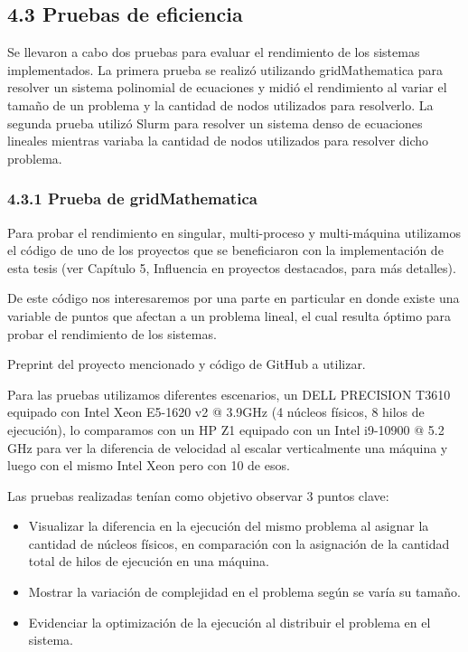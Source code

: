 \begin{spacing}{1.5}
  \subsection{4.3 Pruebas de eficiencia}  \label{chap:4.3}

  Se llevaron a cabo dos pruebas para evaluar el rendimiento de los sistemas implementados. La primera prueba se realizó utilizando gridMathematica para resolver un sistema polinomial de ecuaciones y midió el rendimiento al variar el tamaño de un problema y la cantidad de nodos utilizados para resolverlo. La segunda prueba utilizó Slurm para resolver un sistema denso de ecuaciones lineales mientras variaba la cantidad de nodos utilizados para resolver dicho problema.

  \subsubsection{4.3.1 Prueba de gridMathematica}

  Para probar el rendimiento en singular, multi-proceso y multi-máquina utilizamos el código de uno de los proyectos que se beneficiaron con la implementación de esta tesis (ver Capítulo 5, Influencia en proyectos destacados, para más detalles).

  De este código nos interesaremos por una parte en particular en donde existe una variable de puntos que afectan a un problema lineal, el cual resulta óptimo para probar el rendimiento de los sistemas.

  Preprint del proyecto mencionado y código de GitHub a utilizar. \cite{preprint} \cite{git}

  Para las pruebas utilizamos diferentes escenarios, un DELL PRECISION T3610 equipado con Intel Xeon E5-1620 v2 @ 3.9GHz (4 núcleos físicos, 8 hilos de ejecución), lo comparamos con un HP Z1 equipado con un Intel i9-10900 @ 5.2 GHz para ver la diferencia de velocidad al escalar verticalmente una máquina y luego con el mismo Intel Xeon pero con 10 de esos.

  Las pruebas realizadas tenían como objetivo observar 3 puntos clave:

  \begin{itemize}
    \item Visualizar la diferencia en la ejecución del mismo problema al asignar la cantidad de núcleos físicos, en comparación con la asignación de la cantidad total de hilos de ejecución en una máquina.
    \item Mostrar la variación de complejidad en el problema según se varía su tamaño.
    \item Evidenciar la optimización de la ejecución al distribuir el problema en el sistema.
  \end{itemize}


\end{spacing}
